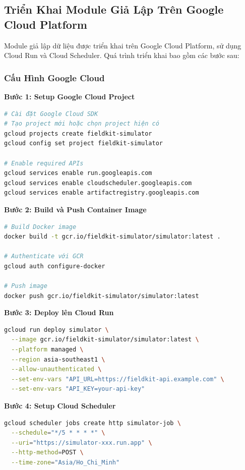 \subsection{Triển Khai Module Giả Lập Trên Google Cloud Platform}

Module giả lập dữ liệu được triển khai trên Google Cloud Platform, sử dụng Cloud Run và Cloud Scheduler. Quá trình triển khai bao gồm các bước sau:

\subsubsection{Cấu Hình Google Cloud}

\textbf{Bước 1: Setup Google Cloud Project}
\begin{lstlisting}[language=bash, caption=Setup GCP project]
# Cài đặt Google Cloud SDK
# Tạo project mới hoặc chọn project hiện có
gcloud projects create fieldkit-simulator
gcloud config set project fieldkit-simulator

# Enable required APIs
gcloud services enable run.googleapis.com
gcloud services enable cloudscheduler.googleapis.com
gcloud services enable artifactregistry.googleapis.com
\end{lstlisting}

\textbf{Bước 2: Build và Push Container Image}
\begin{lstlisting}[language=bash, caption=Build và push image lên GCR]
# Build Docker image
docker build -t gcr.io/fieldkit-simulator/simulator:latest .

# Authenticate với GCR
gcloud auth configure-docker

# Push image
docker push gcr.io/fieldkit-simulator/simulator:latest
\end{lstlisting}

\textbf{Bước 3: Deploy lên Cloud Run}
\begin{lstlisting}[language=bash, caption=Deploy lên Cloud Run]
gcloud run deploy simulator \
  --image gcr.io/fieldkit-simulator/simulator:latest \
  --platform managed \
  --region asia-southeast1 \
  --allow-unauthenticated \
  --set-env-vars "API_URL=https://fieldkit-api.example.com" \
  --set-env-vars "API_KEY=your-api-key"
\end{lstlisting}

\textbf{Bước 4: Setup Cloud Scheduler}
\begin{lstlisting}[language=bash, caption=Setup Cloud Scheduler]
gcloud scheduler jobs create http simulator-job \
  --schedule="*/5 * * * *" \
  --uri="https://simulator-xxx.run.app" \
  --http-method=POST \
  --time-zone="Asia/Ho_Chi_Minh"
\end{lstlisting}

